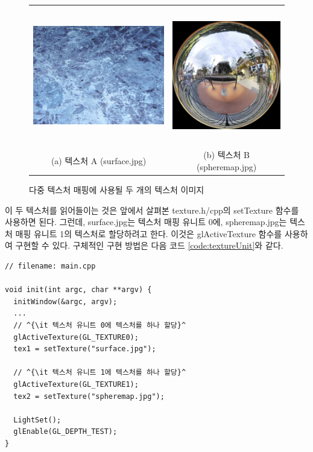 \begin{figure}[h!]
  \centering
	\begin{tabular}{cc}
	\includegraphics[height=6cm]{OGL_texture/multiTex_A.png} &
	\includegraphics[height=6cm]{OGL_texture/multiTex_B.png}  \\
	{\sf \small (a) 텍스처 A (surface.jpg)} & {\sf \small (b) 텍스처 B (spheremap.jpg)}
	\end{tabular}
    \caption{다중 텍스처 매핑에 사용될 두 개의 텍스처 이미지}
    \label{fig:OGL_texture:multiTex}
\end{figure}

이 두 텍스처를 읽어들이는 것은 앞에서 살펴본 {\sf texture.h/cpp}의 {\sf setTexture} 함수를 사용하면 된다. 그런데, {\sf surface.jpg}는 텍스처 매핑 유니트 0에, 
{\sf spheremap.jpg}는 텍스처 매핑 유니트 1의 텍스처로 할당하려고 한다. 이것은 {\sf glActiveTexture} 함수를 사용하여 구현할 수 있다. 
구체적인 구현 방법은 다음 코드 \ref{code:textureUnit}와 같다.

\begin{algorithmbis}\label{code:textureUnit}
\lstset{language=C++, escapechar=^} 
\begin{lstlisting}
// filename: main.cpp

void init(int argc, char **argv) {
  initWindow(&argc, argv);
  ...
  // ^{\it 텍스처 유니트 0에 텍스처를 하나 할당}^
  glActiveTexture(GL_TEXTURE0);
  tex1 = setTexture("surface.jpg");

  // ^{\it 텍스처 유니트 1에 텍스처를 하나 할당}^
  glActiveTexture(GL_TEXTURE1);
  tex2 = setTexture("spheremap.jpg");

  LightSet();
  glEnable(GL_DEPTH_TEST);
}
\end{lstlisting}
\end{algorithmbis}

